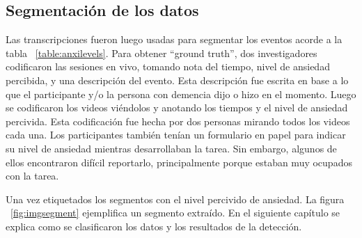\subsection{Segmentaci\'on de los datos}\label{secc:datasegmentation}
Las transcripciones fueron luego usadas para segmentar los eventos acorde a la tabla ~\ref{table:anxilevels}.
Para obtener ``ground truth'', dos investigadores codificaron las sesiones en vivo, tomando nota del tiempo, nivel de ansiedad percibida, y una descripci\'on del evento. Esta descripci\'on fue escrita en base a lo que el participante y/o la persona con demencia dijo o hizo en el momento. Luego se codificaron los videos vi\'endolos y anotando los tiempos y el nivel de ansiedad percivida. Esta codificaci\'on fue hecha por dos personas mirando todos los videos cada una. Los participantes tambi\'en ten\'ian un formulario en papel para indicar su nivel de ansiedad mientras desarrollaban la tarea. Sin embargo, algunos de ellos encontraron dif\'icil reportarlo, principalmente porque estaban muy ocupados con la tarea.


Una vez etiquetados los segmentos con el nivel percivido de ansiedad. La figura ~\ref{fig:imgsegment} ejemplifica un segmento extra\'ido. En el siguiente cap\'itulo se explica como se clasificaron los datos y los resultados de la detecci\'on.

